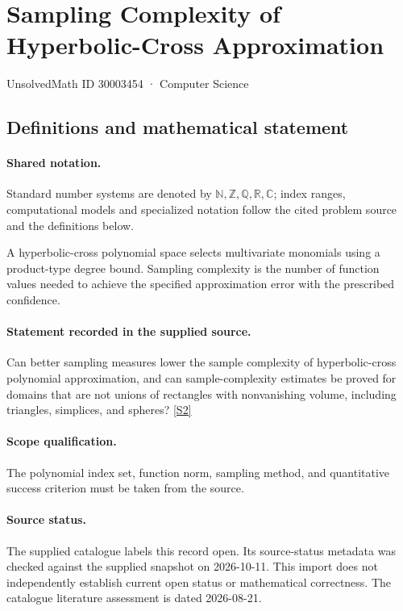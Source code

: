 \documentclass[11pt]{article}
\newcommand{\sref}[2]{\hyperlink{source:#1:#2}{[S#2]}}
\begin{document}
\setcounter{section}{30003453}
\section{Sampling Complexity of Hyperbolic-Cross Approximation}\label{30003454}
{\small\sffamily UnsolvedMath ID 30003454 · Computer Science}
\subsection{Definitions and mathematical statement}

\paragraph{Shared notation.}Standard number systems are denoted by $\mathbb N,\mathbb Z,\mathbb Q,\mathbb R,\mathbb C$; index ranges, computational models and specialized notation follow the cited problem source and the definitions below.


A hyperbolic-cross polynomial space selects multivariate monomials using a product-type degree bound. Sampling complexity is the number of function values needed to achieve the specified approximation error with the prescribed confidence.
\paragraph{Statement recorded in the supplied source.}
Can better sampling measures lower the sample complexity of hyperbolic-cross polynomial approximation, and can sample-complexity estimates be proved for domains that are not unions of rectangles with nonvanishing volume, including triangles, simplices, and spheres? \sref{30003454}{2}
\paragraph{Scope qualification.}
The polynomial index set, function norm, sampling method, and quantitative success criterion must be taken from the source.
\paragraph{Source status.}
The supplied catalogue labels this record open. Its source-status metadata was checked against the supplied snapshot on 2026-10-11. This import does not independently establish current open status or mathematical correctness. The catalogue literature assessment is dated 2026-08-21.
\end{document}
